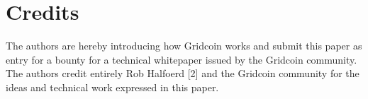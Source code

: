 \section{Credits}
\label{sec:credits}

The authors are hereby introducing how Gridcoin works and submit this paper as entry for a bounty for a technical whitepaper issued by the Gridcoin community. The authors credit entirely Rob Halfoerd [2] and the Gridcoin community for the ideas and technical work expressed in this paper.